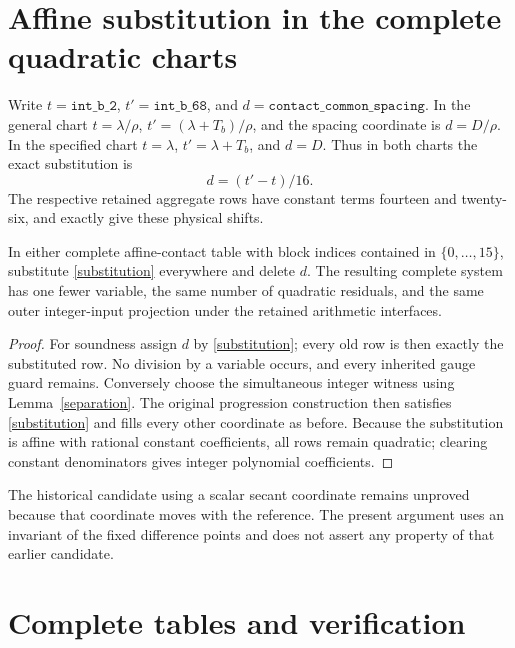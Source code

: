 \documentclass[11pt]{article}
\begin{document}
\section{Affine substitution in the complete quadratic charts}

Write \(t=\texttt{int\_b\_2}\), \(t'=\texttt{int\_b\_68}\),
and \(d=\texttt{contact\_common\_spacing}\). In the general
chart \(t=\lambda/\rho\), \(t'=(\lambda+T_b)/\rho\),
and the spacing coordinate is \(d=D/\rho\). In the specified
chart \(t=\lambda\), \(t'=\lambda+T_b\), and \(d=D\).
Thus in both charts the exact substitution is
\begin{equation}\label{substitution}
                              d=(t'-t)/16.
\end{equation}
The respective retained aggregate rows have constant terms fourteen
and twenty-six, and exactly give these physical shifts.

\begin{theorem}
In either complete affine-contact table with block indices contained
in \(\{0,\ldots,15\}\), substitute \eqref{substitution} everywhere
and delete \(d\). The resulting complete system has one fewer
variable, the same number of quadratic residuals, and the same outer
integer-input projection under the retained arithmetic interfaces.
\end{theorem}
\begin{proof}
For soundness assign \(d\) by \eqref{substitution}; every old row is
then exactly the substituted row. No division by a variable occurs,
and every inherited gauge guard remains. Conversely choose the
simultaneous integer witness using Lemma~\ref{separation}. The original
progression construction then satisfies \eqref{substitution} and
fills every other coordinate as before. Because the substitution is
affine with rational constant coefficients, all rows remain quadratic;
clearing constant denominators gives integer polynomial coefficients.
\end{proof}

The historical candidate using a scalar secant coordinate remains
unproved because that coordinate moves with the reference. The present
argument uses an invariant of the fixed difference points and does not
assert any property of that earlier candidate.

\section{Complete tables and verification}
\end{document}
